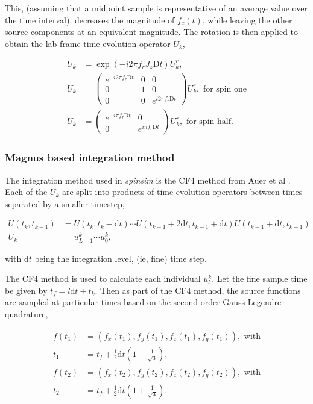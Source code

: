\documentclass{jors}
\begin{document}
			This, (assuming that a midpoint sample is representative of an average value over the time interval), decreases the magnitude of \(f_z(t)\), while leaving the other source components at an equivalent magnitude. The rotation is then applied to obtain the lab frame time evolution operator \(U_k\),
			
			\begin{align*}
				U_k &= \exp(-i 2 \pi f_r J_z \mathrm{D}t) U^r_k,\\
				U_k &= \begin{pmatrix}
					e^{-i 2\pi f_r \mathrm{D}t} & 0 & 0\\
					0 & 1 & 0\\
					0 & 0 & e^{i 2\pi f_r \mathrm{D}t}
				\end{pmatrix} U^r_k, \textrm{ for spin one}\\
				U_k &= \begin{pmatrix}
					e^{-i \pi f_r \mathrm{D}t} & 0\\
					0 & e^{i \pi f_r \mathrm{D}t}
				\end{pmatrix} U^r_k, \textrm{ for spin half.}
			\end{align*}
			
		\subsubsection*{Magnus based integration method}
			The integration method used in \emph{spinsim} is the CF4 method from Auer et al \cite{auer_magnus_2018}. Each of the \(U_k\) are split into products of time evolution operators between times separated by a smaller timestep,
			
			\begin{align*}
				U(t_k, t_{k-1}) &= U(t_k, t_k - \mathrm{d}t) \cdots U(t_{k-1} + 2\mathrm{d}t, t_{k-1} + \mathrm{d}t) U(t_{k-1} + \mathrm{d}t, t_{k-1})\\
				U_k &= u^k_{L-1} \cdots u^k_0,
			\end{align*}
			
			with \(\mathrm{d}t\) being the integration level, (ie, fine) time step.

			The CF4 method is used to calculate each individual \(u^k_l\). Let the fine sample time be given by \(t_f = l\mathrm{d}t + t_k\). Then as part of the CF4 method, the source functions are sampled at particular times based on the second order Gauss-Legendre quadrature,
			
			\begin{align*}
				f(t_1) &= (f_x(t_1), f_y(t_1), f_z(t_1), f_q(t_1)), \textrm{ with}\\
				t_1 &= t_f + \frac12 \mathrm{d}t\left(1 - \frac{1}{\sqrt{3}}\right),\\
				f(t_2) &= (f_x(t_2), f_y(t_2), f_z(t_2), f_q(t_2)), \textrm{ with}\\
				t_2 &= t_f + \frac12 \mathrm{d}t\left(1 + \frac{1}{\sqrt{3}}\right).
			\end{align*}
			
\end{document}
